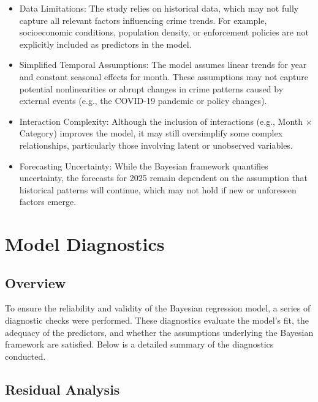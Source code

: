 \documentclass[
  letterpaper,
  DIV=11,
  numbers=noendperiod]{scrartcl}
\begin{document}
\begin{itemize}
\item
  Data Limitations: The study relies on historical data, which may not
  fully capture all relevant factors influencing crime trends. For
  example, socioeconomic conditions, population density, or enforcement
  policies are not explicitly included as predictors in the model.
\item
  Simplified Temporal Assumptions: The model assumes linear trends for
  year and constant seasonal effects for month. These assumptions may
  not capture potential nonlinearities or abrupt changes in crime
  patterns caused by external events (e.g., the COVID-19 pandemic or
  policy changes).
\item
  Interaction Complexity: Although the inclusion of interactions (e.g.,
  Month × Category) improves the model, it may still oversimplify some
  complex relationships, particularly those involving latent or
  unobserved variables.
\item
  Forecasting Uncertainty: While the Bayesian framework quantifies
  uncertainty, the forecasts for 2025 remain dependent on the assumption
  that historical patterns will continue, which may not hold if new or
  unforeseen factors emerge.
\end{itemize}

\newpage

\appendix

\section{Model Diagnostics}\label{sec-model-detail}

\subsection{Overview}\label{overview-2}

To ensure the reliability and validity of the Bayesian regression model,
a series of diagnostic checks were performed. These diagnostics evaluate
the model's fit, the adequacy of the predictors, and whether the
assumptions underlying the Bayesian framework are satisfied. Below is a
detailed summary of the diagnostics conducted.

\subsection{Residual Analysis}\label{residual-analysis}
\end{document}
